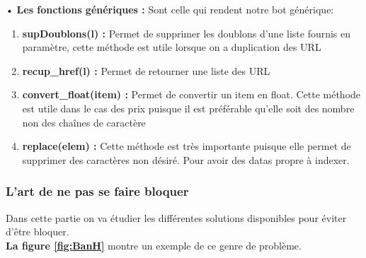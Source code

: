 \begin{itemize}[label=,font=\normalsize]
\begin{enumerate}
            • \textbf{Les fonctions génériques :} Sont celle qui rendent notre bot générique:
             \begin{enumerate}
             \item\textbf{supDoublons(l) :} Permet de supprimer les doublons d’une liste fournis en paramètre, cette méthode est utile lorsque on a duplication des URL
             \item\textbf{recup\_href(l) :} Permet de retourner une liste des URL 
             \item\textbf{convert\_float(item) :} Permet de convertir un item en float. Cette méthode est utile dans le cas des prix puisque il est préférable qu’elle soit des nombre non des chaînes de caractère 
             \item\textbf{replace(elem) :} Cette méthode est très importante puisque elle permet de supprimer des caractères non désiré. Pour avoir des datas propre à indexer.\\
             \end{enumerate}
            
        
    \end{enumerate}
    \end{itemize}
    
    \subsubsection{L'art de ne pas se faire bloquer }
    Dans cette partie on va étudier les différentes solutions disponibles pour éviter d'être bloquer.\\
    \textbf{La figure \ref{fig:BanH}} montre un exemple de ce genre de problème.
        
